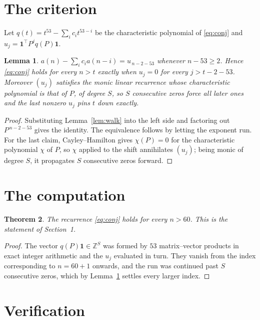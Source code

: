\documentclass[11pt,a4paper]{article}
\theoremstyle{plain}
\newtheorem{theorem}{Theorem}
\newtheorem{lemma}[theorem]{Lemma}
\theoremstyle{definition}
\begin{document}
\section{The criterion}

Let $q(t)=t^{53}-\sum_i c_i t^{53-i}$ be the characteristic polynomial of
\eqref{eq:conj} and $u_j=\mathbf{1}^{\!\top}P^{j}q(P)\mathbf{1}$.

\begin{lemma}\label{lem:crit}
$a(n)-\sum_i c_i a(n-i)=u_{\,n-2-53}$ whenever $n-53\ge2$. Hence
\eqref{eq:conj} holds for every $n>t$ exactly when $u_j=0$ for every
$j>t-2-53$. Moreover $(u_j)$ satisfies the monic linear recurrence whose
characteristic polynomial is that of $P$, of degree $S$, so $S$ consecutive zeros force all
later ones and the last nonzero $u_j$ pins $t$ down exactly.
\end{lemma}

\begin{proof}
Substituting Lemma~\ref{lem:walk} into the left side and factoring out
$P^{\,n-2-53}$ gives the identity. The equivalence follows by letting the exponent
run. For the last claim, Cayley--Hamilton gives $\chi(P)=0$ for the characteristic
polynomial $\chi$ of $P$, so $\chi$ applied to the shift annihilates $(u_j)$; being monic of
degree $S$, it propagates $S$ consecutive zeros forward.
\end{proof}

\section{The computation}

\begin{theorem}
The recurrence \eqref{eq:conj} holds for every $n>60$. This is the statement of
Section~1.
\end{theorem}

\begin{proof}
The vector $q(P)\mathbf{1}\in\mathbb{Z}^{S}$ was formed by $53$ matrix--vector
products in exact integer arithmetic and the $u_j$ evaluated in turn. They vanish from the
index corresponding to $n=60+1$ onwards, and the run was continued past $S$ consecutive
zeros, which by Lemma~\ref{lem:crit} settles every larger index.
\end{proof}

\section{Verification}
\end{document}
